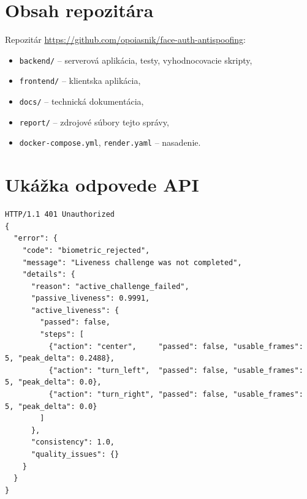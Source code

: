 \chapter{Obsah repozitára}
\label{app:repo}

Repozitár \url{https://github.com/opoiasnik/face-auth-antispoofing}:

\begin{itemize}
  \item \texttt{backend/} -- serverová aplikácia, testy, vyhodnocovacie skripty,
  \item \texttt{frontend/} -- klientska aplikácia,
  \item \texttt{docs/} -- technická dokumentácia,
  \item \texttt{report/} -- zdrojové súbory tejto správy,
  \item \texttt{docker-compose.yml}, \texttt{render.yaml} -- nasadenie.
\end{itemize}

\chapter{Ukážka odpovede API}
\label{app:api}

\begin{lstlisting}[caption={Zamietnutie relácie pri útoku statickou fotografiou}]
HTTP/1.1 401 Unauthorized
{
  "error": {
    "code": "biometric_rejected",
    "message": "Liveness challenge was not completed",
    "details": {
      "reason": "active_challenge_failed",
      "passive_liveness": 0.9991,
      "active_liveness": {
        "passed": false,
        "steps": [
          {"action": "center",     "passed": false, "usable_frames": 5, "peak_delta": 0.2488},
          {"action": "turn_left",  "passed": false, "usable_frames": 5, "peak_delta": 0.0},
          {"action": "turn_right", "passed": false, "usable_frames": 5, "peak_delta": 0.0}
        ]
      },
      "consistency": 1.0,
      "quality_issues": {}
    }
  }
}
\end{lstlisting}
